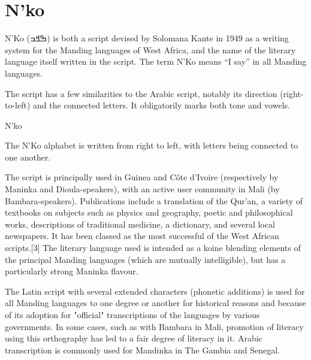 \section{N'ko}

\newfontfamily{}

N'Ko {\nko(ߒߞߏ)} is both a script devised by Solomana Kante in 1949 as a writing system for the Manding languages of West Africa, and the name of the literary language itself written in the script. The term N'Ko means ``I say'' in all Manding languages.

The script has a few similarities to the Arabic script, notably its direction (right-to-left) and the connected letters. It obligatorily marks both tone and vowels.


\begin{scriptexample}[]{N'ko}
\end{scriptexample}

The N'Ko alphabet is written from right to left, with letters being connected to one another.

The script is principally used in Guinea and Côte d'Ivoire (respectively by Maninka and Dioula-speakers), with an active user community in Mali (by Bambara-speakers). Publications include a translation of the Qur'an, a variety of textbooks on subjects such as physics and geography, poetic and philosophical works, descriptions of traditional medicine, a dictionary, and several local newspapers. It has been classed as the most successful of the West African scripts.[3] The literary language used is intended as a koine blending elements of the principal Manding languages (which are mutually intelligible), but has a particularly strong Maninka flavour.

The Latin script with several extended characters (phonetic additions) is used for all Manding languages to one degree or another for historical reasons and because of its adoption for "official" transcriptions of the languages by various governments. In some cases, such as with Bambara in Mali, promotion of literacy using this orthography has led to a fair degree of literacy in it. Arabic transcription is commonly used for Mandinka in The Gambia and Senegal.

